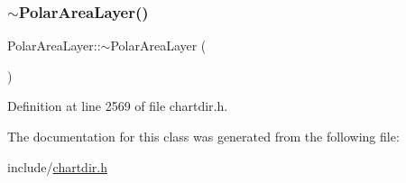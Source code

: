 \subsubsection{\texorpdfstring{$\sim$\+Polar\+Area\+Layer()}{~PolarAreaLayer()}}
{\footnotesize\ttfamily Polar\+Area\+Layer\+::$\sim$\+Polar\+Area\+Layer (\begin{DoxyParamCaption}{ }\end{DoxyParamCaption})\hspace{0.3cm}{\ttfamily [inline]}}



Definition at line 2569 of file chartdir.\+h.



The documentation for this class was generated from the following file\+:\begin{DoxyCompactItemize}
\item 
include/\hyperlink{chartdir_8h}{chartdir.\+h}\end{DoxyCompactItemize}
